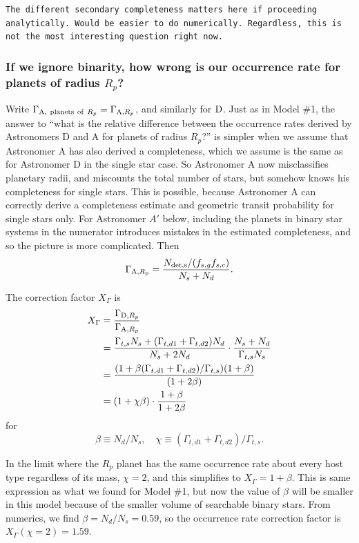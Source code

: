 \documentclass{emulateapj}
\begin{document}
\texttt{The different secondary completeness matters here if proceeding 
analytically. Would be easier to do numerically.
Regardless, this is not the most interesting question right now.}

\subsubsection{If we ignore binarity, how wrong is our occurrence rate for
planets of radius $R_p$?}
\label{subsubsec:model2_A}

Write $\Gamma_{{\rm A,\ planets\ of\ }R_p} = \Gamma_{{\rm A,}R_p}$, 
and similarly for ${\rm D}$.
Just as in Model \#1, the answer to ``what is the relative difference between 
the occurrence rates derived by Astronomers D and A for planets of radius 
$R_p$?''
is simpler when we assume that Astronomer A has also derived a 
completeness, which we assume is the same as for Astronomer D in the single 
star case.
So Astronomer A now misclassifies planetary radii, and miscounts the total 
number of stars, but somehow knows his completeness for single 
stars. This is possible, because Astronomer A can correctly derive a 
completeness estimate and geometric transit probability for single stars only. 
For Astronomer $A'$ below, including the planets in binary star systems in the 
numerator introduces mistakes in the estimated completeness, and so the picture 
is more complicated.
Then
\begin{equation}
	\Gamma_{{\rm A}, R_p} = \frac{N_{\rm det,s}/(f_{s,g} f_{s,c})}{N_s + N_d}.
\end{equation}

The correction factor $X_\Gamma$ is
\begin{align}
X_\Gamma &=
\frac{\Gamma_{{\rm D},R_p}}{\Gamma_{{\rm A},R_p}} \\
&=
\frac{\Gamma_{t,s}N_s + (\Gamma_{t,d1} + 
	\Gamma_{t,d2})N_d}{N_s + 2N_d}  
\cdot 
\frac{N_s + N_d}{\Gamma_{t,s} N_s } \\
&= 
\frac{(1 + \beta (\Gamma_{t,d1}+\Gamma_{t,d2})/\Gamma_{t,s})(1 + 
	\beta)}{(1+2\beta)} 	\\
&=
(1 + \chi \beta )
\cdot 
\frac{1 + \beta}{1 + 2\beta }
\end{align} 
for
\begin{equation}
\beta \equiv N_d/N_s, \quad \chi \equiv 
(\Gamma_{t,d1}+\Gamma_{t,d2})/\Gamma_{t,s}.
\end{equation}

In the limit where the $R_p$ planet has the same occurrence rate about every 
host type regardless of its mass, $\chi=2$, and this simplifies to $X_\Gamma = 
1+\beta$.
This is same expression as what we found for Model \#1, but now the value of 
$\beta$ will be smaller in this model because of the 
smaller volume of searchable binary stars.
From numerics, we find $\beta = N_d/N_s = 0.59$, so the occurrence rate 
correction factor is $X_\Gamma(\chi=2) = 1.59$.
\end{document}

